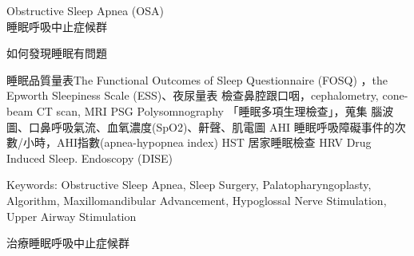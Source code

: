 \documentclass[aspectratio=169]{beamer}
\begin{document}
\begin{frame}
Obstructive Sleep Apnea (OSA)\\
睡眠呼吸中止症候群
\end{frame}

\begin{frame}{如何發現睡眠有問題}
    \begin{outline}
    \1 睡眠品質量表The Functional Outcomes of Sleep Questionnaire (FOSQ) ，the Epworth Sleepiness Scale (ESS)、夜尿量表
    \1 檢查鼻腔跟口咽，cephalometry, cone-beam CT scan, MRI
    \1 PSG Polysomnography 「睡眠多項生理檢查」，蒐集
        \2 腦波圖、口鼻呼吸氣流、血氧濃度(SpO2)、鼾聲、肌電圖
        \2 AHI  睡眠呼吸障礙事件的次數/小時，AHI指數(apnea-hypopnea index)
    \1 HST 居家睡眠檢查
    \1 HRV
    \1 Drug Induced Sleep. Endoscopy (DISE) 
    \end{outline}
Keywords: Obstructive Sleep Apnea, Sleep Surgery, Palatopharyngoplasty, Algorithm, Maxillomandibular Advancement, Hypoglossal Nerve Stimulation, Upper Airway Stimulation \end{frame}


\begin{frame}{治療睡眠呼吸中止症候群}

\begin{adjustbox}{minipage=15cm, center}


\end{adjustbox}
\end{frame}
\end{document}
